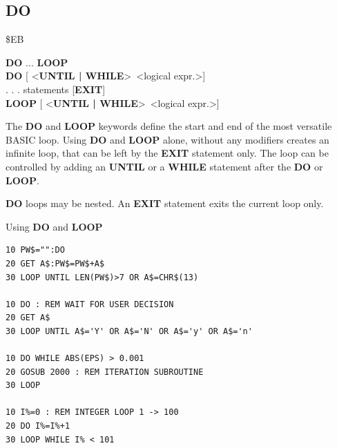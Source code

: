 \subsection{DO}
\begin{description}[leftmargin=2cm,style=nextline]
\item [Token:] \$EB
\item [Format:] {\bf DO} ... {\bf LOOP} \\
                {\bf DO} [ <{\bf UNTIL | WHILE}> <logical expr.>] \\
                . . . statements [{\bf EXIT}] \\
                {\bf LOOP} [ <{\bf UNTIL | WHILE}> <logical expr.>]
\item [Usage:] The {\bf DO} and {\bf LOOP} keywords define
               the start and end of the most versatile BASIC loop.
               Using {\bf DO} and {\bf LOOP} alone, without any
               modifiers creates an infinite loop, that can be left
               by the {\bf EXIT} statement only. The loop can be
               controlled by adding an {\bf UNTIL} or a {\bf WHILE}
               statement after the {\bf DO} or {\bf LOOP}.

\item [Remarks:] {\bf DO} loops may be nested. An {\bf EXIT} statement
               exits the current loop only.
\item [Example:] Using {\bf DO} and {\bf LOOP}
\begin{tcolorbox}[colback=black,coltext=white]
\verbatimfont{\codefont}
\begin{verbatim}
10 PW$="":DO
20 GET A$:PW$=PW$+A$
30 LOOP UNTIL LEN(PW$)>7 OR A$=CHR$(13)

10 DO : REM WAIT FOR USER DECISION
20 GET A$
30 LOOP UNTIL A$='Y' OR A$='N' OR A$='y' OR A$='n'

10 DO WHILE ABS(EPS) > 0.001
20 GOSUB 2000 : REM ITERATION SUBROUTINE
30 LOOP

10 I%=0 : REM INTEGER LOOP 1 -> 100
20 DO I%=I%+1
30 LOOP WHILE I% < 101
\end{verbatim}
\end{tcolorbox}
\end{description}


\newpage
